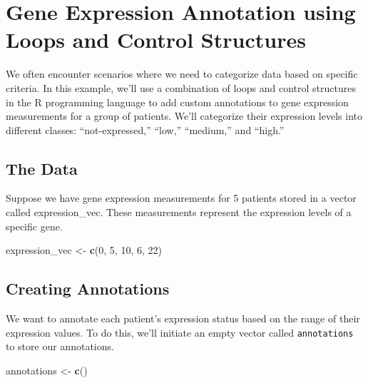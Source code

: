 \documentclass[
]{book}
\newenvironment{Shaded}{\begin{snugshade}}{\end{snugshade}}
\newcommand{\DecValTok}[1]{\textcolor[rgb]{0.00,0.00,0.81}{#1}}
\newcommand{\FunctionTok}[1]{\textcolor[rgb]{0.13,0.29,0.53}{\textbf{#1}}}
\newcommand{\NormalTok}[1]{#1}
\newcommand{\OtherTok}[1]{\textcolor[rgb]{0.56,0.35,0.01}{#1}}
\begin{document}
\hypertarget{gene-expression-annotation-using-loops-and-control-structures}{%
\section{Gene Expression Annotation using Loops and Control Structures}\label{gene-expression-annotation-using-loops-and-control-structures}}

We often encounter scenarios where we need to categorize data based on specific criteria. In this example, we'll use a combination of loops and control structures in the R programming language to add custom annotations to gene expression measurements for a group of patients. We'll categorize their expression levels into different classes: ``not-expressed,'' ``low,'' ``medium,'' and ``high.''

\hypertarget{the-data}{%
\subsection{The Data}\label{the-data}}

Suppose we have gene expression measurements for 5 patients stored in a vector called expression\_vec. These measurements represent the expression levels of a specific gene.

\begin{Shaded}
\begin{Highlighting}[]
\NormalTok{expression\_vec }\OtherTok{\textless{}{-}} \FunctionTok{c}\NormalTok{(}\DecValTok{0}\NormalTok{, }\DecValTok{5}\NormalTok{, }\DecValTok{10}\NormalTok{, }\DecValTok{6}\NormalTok{, }\DecValTok{22}\NormalTok{)}
\end{Highlighting}
\end{Shaded}

\hypertarget{creating-annotations}{%
\subsection{Creating Annotations}\label{creating-annotations}}

We want to annotate each patient's expression status based on the range of their expression values. To do this, we'll initiate an empty vector called \texttt{annotations} to store our annotations.

\begin{Shaded}
\begin{Highlighting}[]
\NormalTok{annotations }\OtherTok{\textless{}{-}} \FunctionTok{c}\NormalTok{()}
\end{Highlighting}
\end{Shaded}
\end{document}
